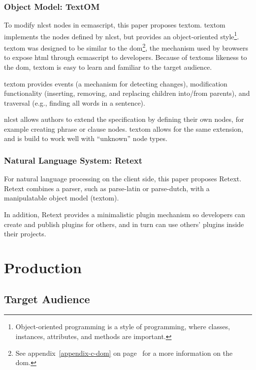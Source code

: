 \subsection{Object Model: TextOM}\label{object-model}

To modify \gls{nlcst} nodes in \gls{ecmascript}, this paper proposes
\gls{textom}. \gls{textom} implements the nodes defined by \gls{nlcst},
but provides an object-oriented style\footnote{Object-oriented
  programming is a style of programming, where classes, instances,
  attributes, and methods are important.}. \gls{textom} was designed to
  be similar to the \gls{dom}\footnote{See appendix~\ref{appendix-c-dom} on
  page~\pageref{appendix-c-dom} for a more
  information on the \gls{dom}.}, the mechanism used by browsers to
expose \gls{html} through \gls{ecmascript} to developers. Because of
\glspl{textom} likeness to the \gls{dom}, \gls{textom} is easy to learn
and familiar to the target audience.

\Gls{textom} provides events (a mechanism for detecting changes),
modification functionality (inserting, removing, and replacing children
into\slash from parents), and traversal (e.g., finding all words in a
sentence).

\Gls{nlcst} allows authors to extend the specification by defining their
own nodes, for example creating phrase or clause nodes. \Gls{textom}
allows for the same extension, and is build to work well with
``unknown'' node types.

\subsection{Natural Language System:
Retext}\label{natural-language-system-retext}

For natural language processing on the client side, this paper proposes
Retext. Retext combines a parser, such as parse-latin or parse-dutch,
with a manipulatable object model (\gls{textom}).

In addition, Retext provides a minimalistic plugin mechanism so
developers can create and publish plugins for others, and in turn can
use others' plugins inside their projects.

\chapter{Production}\label{production}

\section{Target Audience}\label{target-audience}

